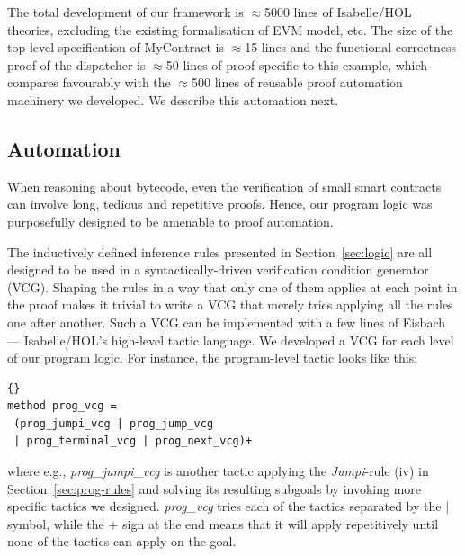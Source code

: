\documentclass[sigplan,10pt,review]{acmart}\settopmatter{printfolios=true,printccs=false,printacmref=false}
\begin{document}

The total development of our framework is $\approx$5000 lines of Isabelle/HOL theories,
excluding the existing formalisation of EVM model, etc.
The size of the top-level specification of MyContract is $\approx$15 lines
and the functional correctness proof of the dispatcher is
$\approx$50 lines of proof specific to this example, which compares
favourably with the $\approx$500 lines of reusable proof
automation machinery we developed.
We describe this automation next.





\subsection{Automation}
\label{sec:auto}

When reasoning about bytecode, even the verification of small smart contracts
can involve long, tedious and repetitive proofs.
Hence, our program logic was purposefully designed to be
amenable to proof automation.

The inductively defined inference rules presented in Section~\ref{sec:logic}
are all designed to be used in a syntactically-driven verification
condition generator (VCG).
Shaping the rules in a way that only one of them applies at each point in the
proof makes it trivial to write a VCG that merely tries applying all the rules
one after another.
Such a VCG can be implemented with a few lines of Eisbach~\cite{Matichuk_MW_16} ---
Isabelle/HOL's high-level tactic language.
We developed a VCG for each level of our program logic.
For instance, the program-level tactic looks like this:
\begin{lstlisting}[language=Isar]{}
method prog_vcg =
 (prog_jumpi_vcg | prog_jump_vcg
 | prog_terminal_vcg | prog_next_vcg)+
\end{lstlisting}
where e.g., \textit{prog\_jumpi\_vcg} is another tactic applying the \textit{Jumpi}-rule (iv) 
in Section~\ref{sec:prog-rules} and solving its resulting subgoals by
invoking more specific tactics we designed.
\textit{prog\_vcg} tries each of the tactics separated by the $|$ symbol,
while the $+$ sign at the end means that it will apply repetitively until
none of the tactics can apply on the goal.
\end{document}
